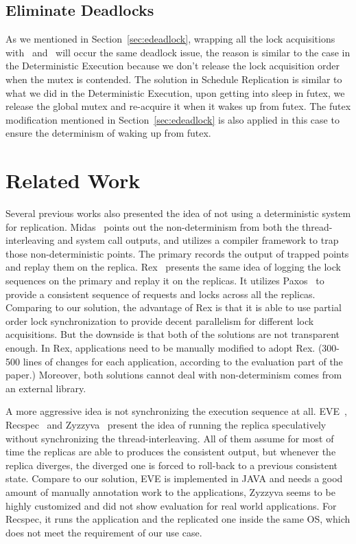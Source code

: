 \subsection{Eliminate Deadlocks} \label{sec:rdeadlock}
As we mentioned in Section~\ref{sec:edeadlock}, wrapping all the lock acquisitions with \detstart\ and \detend\ will occur the same deadlock issue, the reason is similar to the case in the Deterministic Execution because we don't release the lock acquisition order when the mutex is contended. The solution in Schedule Replication is similar to what we did in the Deterministic Execution, upon getting into sleep in futex, we release the global mutex and re-acquire it when it wakes up from futex. The futex modification mentioned in Section~\ref{sec:edeadlock} is also applied in this case to ensure the determinism of waking up from futex.

\section{Related Work}
Several previous works also presented the idea of not using a deterministic system for replication. Midas~\cite{slember2006static} points out the non-determinism from both the thread-interleaving and system call outputs, and utilizes a compiler framework to trap those non-deterministic points. The primary records the output of trapped points and replay them on the replica. Rex~\cite{guo2014rex} presents the same idea of logging the lock sequences on the primary and replay it on the replicas. It utilizes Paxos~\cite{lamport2001paxos} to provide a consistent sequence of requests and locks across all the replicas. Comparing to our solution, the advantage of Rex is that it is able to use partial order lock synchronization to provide decent parallelism for different lock acquisitions. But the downside is that both of the solutions are not transparent enough. In Rex, applications need to be manually modified to adopt Rex. (300-500 lines of changes for each application, according to the evaluation part of the paper.) Moreover, both solutions cannot deal with non-determinism comes from an external library.

A more aggressive idea is not synchronizing the execution sequence at all. EVE~\cite{kapritsos2012all}, Recspec~\cite{lee2010respec} and Zyzzyva~\cite{kotla2007zyzzyva} present the idea of running the replica speculatively without synchronizing the thread-interleaving. All of them assume for most of time the replicas are able to produces the consistent output, but whenever the replica diverges, the diverged one is forced to roll-back to a previous consistent state. Compare to our solution, EVE is implemented in JAVA and needs a good amount of manually annotation work to the applications, Zyzzyva seems to be highly customized and did not show evaluation for real world applications. For Recspec, it runs the application and the replicated one inside the same OS, which does not meet the requirement of our use case.